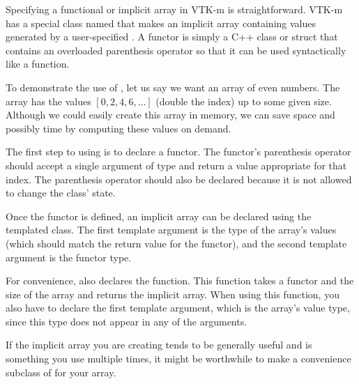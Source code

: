 

Specifying a functional or implicit array in VTK-m is straightforward.
VTK-m has a special class named  that makes
an implicit array containing values generated by a user-specified
.  A functor is simply a C++ class or
struct that contains an overloaded parenthesis operator so that it can be
used syntactically like a function.

To demonstrate the use of , let us say
we want an array of even numbers. The array has the values
$[0,2,4,6,\ldots]$ (double the index) up to some given size. Although we
could easily create this array in memory, we can save space and possibly
time by computing these values on demand.

The first step to using  is to declare
a functor. The functor's parenthesis operator should accept a single
argument of type  and return a value appropriate for that index.
The parenthesis operator should also be declared  because
it is not allowed to change the class' state.


Once the functor is defined, an implicit array can be declared using the
templated  class. The first template argument
is the type of the array's values (which should match the return value for
the functor), and the second template argument is the functor type.


For convenience,  also
declares the  function. This function
takes a functor and the size of the array and returns the implicit array.
When using this function, you also have to declare the first template
argument, which is the array's value type, since this type does not appear
in any of the arguments.


If the implicit array you are creating tends to be generally useful and is
something you use multiple times, it might be worthwhile to make a
convenience subclass of  for your array.

